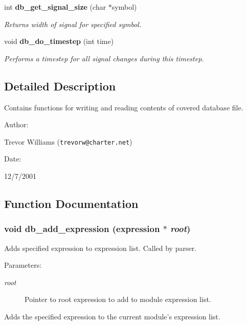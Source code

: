 \begin{CompactItemize}
int {\bf db\_\-get\_\-signal\_\-size} (char $\ast$symbol)
\begin{CompactList}\small\item\em Returns width of signal for specified symbol.\item\end{CompactList}\item 
void {\bf db\_\-do\_\-timestep} (int time)
\begin{CompactList}\small\item\em Performs a timestep for all signal changes during this timestep.\item\end{CompactList}\end{CompactItemize}


\subsection{Detailed Description}
Contains functions for writing and reading contents of covered database file.



\begin{Desc}
\item[Author: ]\par
Trevor Williams ({\tt trevorw@charter.net}) \end{Desc}
\begin{Desc}
\item[Date: ]\par
12/7/2001\end{Desc}


\subsection{Function Documentation}
\subsubsection{\setlength{\rightskip}{0pt plus 5cm}void db\_\-add\_\-expression ({\bf expression} $\ast$ {\em root})}\label{db_8h_a7}


Adds specified expression to expression list. Called by parser.

\begin{Desc}
\item[Parameters: ]\par
\begin{description}
\item[{\em 
root}]Pointer to root expression to add to module expression list.\end{description}
\end{Desc}
Adds the specified expression to the current module's expression list. 
